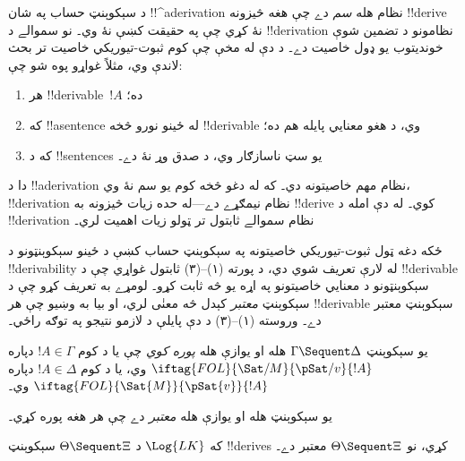 \documentclass[../../../include/open-logic-section]{subfiles}
\begin{document}
      {}
      {}


\begin{explain}
د سېکوېنټ حساب په شان !!^a{derivation} نظام هله \emph{سم} دے چې
هغه څيزونه !!{derive} نۀ کړي چې په حقيقت کښې نۀ وي۔ نو سموالے د
!!{derivation} نظامونو د تضمين شوې خونديتوب يو ډول خاصيت دے۔
د دې له مخې چې کوم ثبوت-تيوريکي خاصيت تر بحث لاندې وي، مثلاً غواړو
پوه شو چې:
\begin{enumerate}
\item هر !!{derivable}~$!A$  ده؛
\item که !!a{sentence} له ځينو نورو څخه !!{derivable} وي، د هغو
  معنايي پايله هم ده؛
\item که د !!{sentence}s يو سټ ناسازګار وي، د صدق وړ نۀ دے۔
\end{enumerate}
دا د !!a{derivation} نظام مهم خاصيتونه دي۔ که له دغو څخه کوم يو
سم نۀ وي، !!{derivation} نظام نيمګړے دے---له حده زيات څيزونه به
!!{derive} کوي۔ له دې امله د !!{derivation} نظام سموالے ثابتول
تر ټولو زيات اهميت لري۔

ځکه دغه ټول ثبوت-تيوريکي خاصيتونه په سېکوېنټ حساب کښې د ځينو
سېکوېنټونو د !!{derivability} له لارې تعريف شوي دي، د پورته
(۱)--(۳) ثابتول غواړي چې د !!{derivable} سېکوېنټونو د معنايي
خاصيتونو په اړه يو څه ثابت کړو۔ لومړے به تعريف کړو چې د سېکوېنټ
\emph{معتبر} کېدل څه معنٰی لري، او بيا به وښيو چې هر
!!{derivable} سېکوېنټ معتبر دے۔ وروسته (۱)--(۳) د دې پايلې د
لازمو نتيجو په توګه راځي۔
\end{explain}

\begin{defn}
 يو سېکوېنټ
$\Gamma \Sequent \Delta$ هله او يوازې هله \emph{پوره کوي} چې يا
د کوم $!A \in \Gamma$ دپاره
$\iftag{FOL}{\Sat/{M}}{\pSat/{v}}{!A}$ وي، يا د کوم
$!A \in \Delta$ دپاره
$\iftag{FOL}{\Sat{M}}{\pSat{v}}{!A}$ وي۔

يو سېکوېنټ هله او يوازې هله \emph{معتبر} دے چې هر
 هغه پوره کړي۔
\end{defn}

\begin{thm}[سموالے]
 که $\Log{LK}$ د
$\Theta \Sequent \Xi$ سېکوېنټ !!{derive}s کړي، نو
$\Theta \Sequent \Xi$ معتبر دے۔
\end{thm}
\end{document}
